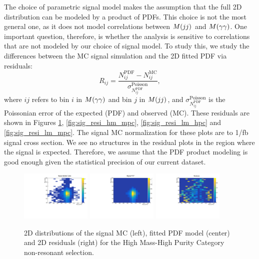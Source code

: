 The choice of parametric signal model makes the assumption that the full 2D distribution can be modeled by a product of PDFs. 
This choice is not the most general one, as it does not model correlations between $M(jj)$ and $M(\gamma\gamma)$. 
One important question, therefore, is whether the analysis is sensitive to correlations that are not modeled by our choice of signal model. 
To study this, we study the differences between the MC signal simulation and the 2D fitted PDF via residuals:
\begin{equation}
R_{ij} = \frac{N^{\textrm{PDF}}_{ij} - N^{\textrm{MC}}_{ij}}{\sigma_{N^{\textrm{PDF}}_{ij}}^{\textrm{Poisson}}},
\end{equation}
where $ij$ refers to bin $i$ in $M(\gamma\gamma)$ and bin $j$ in $M(jj)$, and $\sigma_{N^{\textrm{PDF}}_{ij}}^{\textrm{Poisson}}$ is the Poissonian error of the expected (PDF) and observed (MC).  
These residuals are shown in Figures \ref{fig:sig_resi_hm_hpc}, \ref{fig:sig_resi_hm_mpc}, \ref{fig:sig_resi_lm_hpc} and \ref{fig:sig_resi_lm_mpc}.
The signal MC normalization for these plots are to 1/fb signal cross section. 
We see no structures in the residual plots in the region where the signal is expected. Therefore, we assume that the PDF product modeling is good enough given the statistical precision of our current dataset. 

\begin{figure}[h]
  \centering
\includegraphics[width=0.3\textwidth]{figures/sec-signals/SignalResiduals/h_mc_HM_cat0}\hfil
\includegraphics[width=0.3\textwidth]{figures/sec-signals/SignalResiduals/h_pd_HM_cat0}\hfil
\includegraphics[width=0.3\textwidth]{figures/sec-signals/SignalResiduals/h_re_HM_cat0}\hfil
  \caption{2D distributions of the signal MC (left), fitted PDF model (center) and 2D residuals (right) for the High Mass-High Purity Category non-resonant selection.}
  \label{fig:sig_resi_hm_hpc}
\end{figure}

